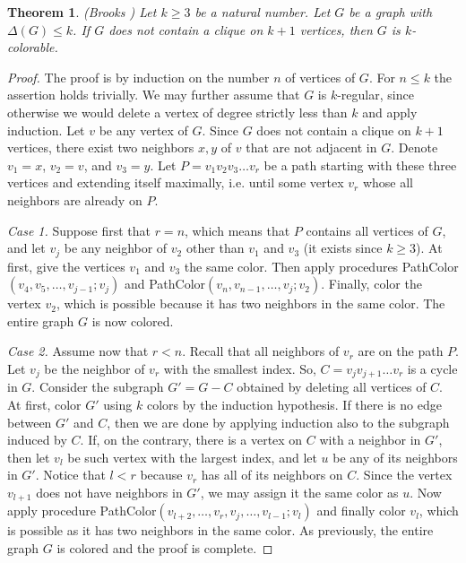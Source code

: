 \documentclass[12pt]{amsart}
\newtheorem{theorem}{Theorem}
\theoremstyle{plain}
\numberwithin{equation}{section}
\begin{document}
\begin{theorem}\emph{(Brooks \cite{Brooks})} \label{Theorem Brooks}
Let $k\geq 3$ be a natural number. Let $G$ be a graph with $\Delta(G)\leq k$. If $G$ does not contain a clique on $k+1$ vertices, then $G$ is $k$-colorable.
\end{theorem}

\begin{proof}
The proof is by induction on the number $n$ of vertices of $G$. For $n \leq k$ the assertion holds trivially.  We may further assume that $G$ is $k$-regular, since otherwise we would delete a vertex of degree strictly less than $k$ and apply induction. Let $v$ be any vertex of $G$. Since $G$ does not contain a clique on $k+1$ vertices, there exist two neighbors $x,y$ of $v$ that are not adjacent in $G$. Denote $v_1=x$, $v_2=v$, and $v_3=y$. Let $P=v_1v_2v_3\dots v_r$ be a path starting with these three vertices and extending itself maximally, i.e. until some vertex $v_r$ whose all neighbors are already on $P$.

\textit{Case 1.} Suppose first that $r=n$, which means that $P$ contains all vertices of $G$, and let $v_j$ be any neighbor of $v_2$ other than $v_1$ and $v_3$ (it exists since $k\geq 3$). At first, give the vertices $v_1$ and $v_3$ the same color. Then apply procedures {\sc PathColor}$ (v_4,v_5,\dots,v_{j-1};v_j)$ and {\sc PathColor}$(v_n,v_{n-1},\dots,v_j;v_2)$. Finally, color the vertex $v_2$, which is possible because it has two neighbors in the same color. The entire graph $G$ is now colored.

\textit{Case 2.} Assume now that $r<n$. Recall that all neighbors of $v_r$ are on the path $P$. Let $v_j$ be the neighbor of $v_r$ with the smallest index. So, $C=v_jv_{j+1}\dots v_r$ is a cycle in $G$. Consider the subgraph $G'=G-C$ obtained by deleting all vertices of $C$. At first, color $G'$ using $k$ colors by the induction hypothesis. If there is no edge between $G'$ and $C$, then we are done by applying induction also to the subgraph induced by $C$. If, on the contrary, there is a vertex on $C$ with a neighbor in $G'$, then let $v_l$ be such vertex with the largest index, and let $u$ be any of its neighbors in $G'$. Notice that $l<r$ because $v_r$ has all of its neighbors on $C$. Since the vertex $v_{l+1}$ does not have neighbors in $G'$, we may assign it the same color as $u$. Now apply procedure {\sc PathColor}$(v_{l+2},\dots,v_r,v_j,\dots,v_{l-1};v_l)$ and finally color $v_l$, which is possible as it has two neighbors in the same color. As previously, the entire graph $G$ is colored and the proof is complete.
\end{proof}
\end{document}
